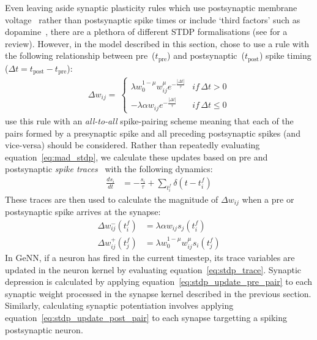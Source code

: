 \documentclass[utf8]{frontiersSCNS} %
\begin{document}
Even leaving aside synaptic plasticity rules which use postsynaptic membrane voltage~\citep{Brader2007,Clopath2010c} rather than postsynaptic spike times or include `third factors' such as dopamine~\citep{Izhikevich2007}, there are a plethora of different STDP formalisations (see \citet{Morrison2008} for a review).
However, in the model described in this section, \citet{Morrison2007} chose to use a rule with the following relationship between pre~($t_{\text{pre}}$) and postsynaptic~($t_{\text{post}}$) spike timing ($\Delta t = t_{\text{post}} - t_{\text{pre}}$):
%
\begin{align}
    \Delta w_{ij} = \
        \begin{cases}
            \lambda w_{0}^{1-\mu} w_{ij}^{\mu} e^{-\frac{|\Delta t|}{\tau}} & if\, \Delta t>0\\
            -\lambda \alpha w_{ij} e^{-\frac{|\Delta t|}{\tau}}             & if\, \Delta t\leq0
        \end{cases}\label{eq:mad_stdp}
\end{align}
%
\citet{Morrison2007} use this rule with an \textit{all-to-all} spike-pairing scheme meaning that each of the pairs formed by a presynaptic spike and all preceding postsynaptic spikes (and vice-versa) should be considered.
Rather than repeatedly evaluating equation~\ref{eq:mad_stdp}, we calculate these updates based on pre and postsynaptic \textit{spike traces}~\citep{Song2000, Morrison2007} with the following dynamics:
%
\begin{align}
    \frac{ds_{i}}{dt} & = -\frac{s_{i}}{\tau} + \sum_{t_{i}^{f}}\delta(t - t_{i}^{f}) \label{eq:stdp_trace}
\end{align}
%
These traces are then used to calculate the magnitude of $\Delta w_{ij}$ when a pre or postsynaptic spike arrives at the synapse:
%
\begin{align}
  \Delta w_{ij}^{-}(t_{i}^{f}) & = \lambda \alpha w_{ij} s_{j}(t_{i}^{f})\label{eq:stdp_update_pre_pair}\\
  \Delta w_{ij}^{+}(t_{j}^{f}) & = \lambda w_{0}^{1-\mu} w_{ij}^{\mu} s_{i}(t_{j}^{f})\label{eq:stdp_update_post_pair}
\end{align}
%
In GeNN, if a neuron has fired in the current timestep, its trace variables are updated in the neuron kernel by evaluating equation~\ref{eq:stdp_trace}.
Synaptic depression is calculated by applying equation~\ref{eq:stdp_update_pre_pair} to each synaptic weight processed in the synapse kernel described in the previous section.
Similarly, calculating synaptic potentiation involves applying equation~\ref{eq:stdp_update_post_pair} to each synapse targetting a spiking postsynaptic neuron.
\end{document}
